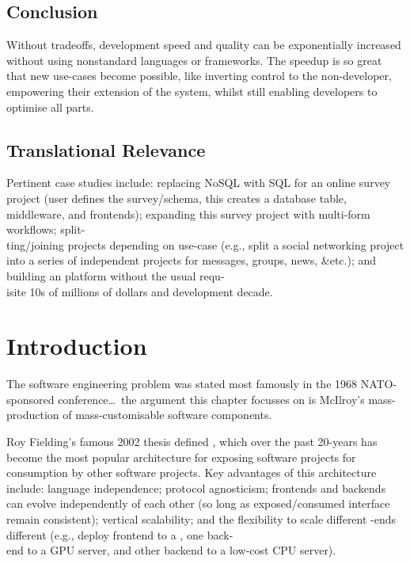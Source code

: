 \subsection{Conclusion}
Without tradeoffs, development speed and quality can be exponentially increased without using nonstandard languages or frameworks. The speedup is so great that new use-cases become possible, like inverting control to the non-developer, empowering their extension of the system, whilst still enabling developers to optimise all parts.

\subsection{Translational Relevance}
Pertinent case studies include: replacing NoSQL with SQL for an online survey project (user defines the survey/schema, this creates a database table, middleware, and frontends); expanding this survey project with multi-form workflows; split-\\ting/joining projects depending on use-case (e.g., split a social networking project into a series of independent projects for messages, groups, news, \&etc.); and building an  platform without the usual requ-\\isite 10s of millions of dollars and development decade.

\pagebreak

\section{Introduction}
The software engineering problem was stated most famously in the 1968 NATO-sponsored conference\ldots~the argument this chapter focusses on is McIlroy's mass-production of mass-customisable software components\cite{mcilroyMassProducedSoftwareComponents1968}.

Roy Fielding's famous 2002 thesis\cite{Fielding:2002:PDM:514183.514185} defined , which over the past 20-years has become the most popular architecture for exposing software projects for consumption by other software projects. Key advantages of this architecture include: language independence; protocol agnosticism; frontends and backends can evolve independently of each other (so long as exposed/consumed interface remain consistent); vertical scalability; and the flexibility to scale different \mbox{-ends} different (e.g., deploy frontend to a , one back-\\end to a GPU server, and other backend to a low-cost CPU server).

